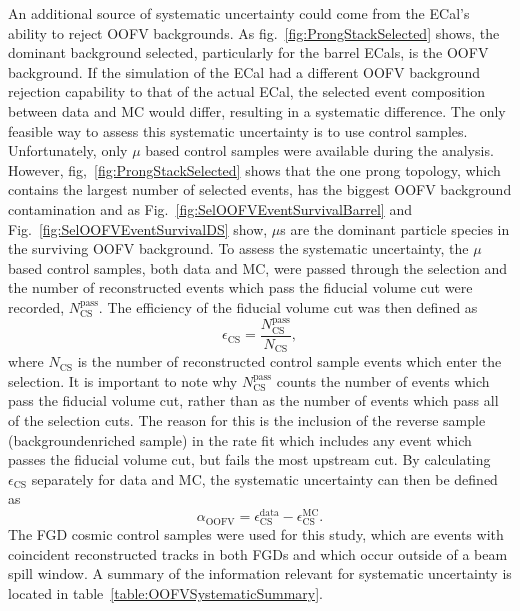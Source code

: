 \newline
\newline
An additional source of systematic uncertainty could come from the ECal's ability to reject OOFV backgrounds. As fig.~\ref{fig:ProngStackSelected} shows, the dominant background selected, particularly for the barrel ECals, is the OOFV background.  If the simulation of the ECal had a different OOFV background rejection capability to that of the actual ECal, the selected event composition between data and MC would differ, resulting in a systematic difference.  The only feasible way to assess this systematic uncertainty is to use control samples.  Unfortunately, only $\mu$ based control samples were available during the analysis.  However, fig,~\ref{fig:ProngStackSelected} shows that the one prong topology, which contains the largest number of selected events, has the biggest OOFV background contamination and as Fig.~\ref{fig:SelOOFVEventSurvivalBarrel} and Fig.~\ref{fig:SelOOFVEventSurvivalDS} show, $\mu$s are the dominant particle species in the surviving OOFV background.  To assess the systematic uncertainty, the $\mu$ based control samples, both data and MC, were passed through the selection and the number of reconstructed events which pass the fiducial volume cut were recorded, $N_{\textrm{CS}}^{\textrm{pass}}$.  The efficiency of the fiducial volume cut was then defined as
\begin{equation}
\epsilon_{\textrm{CS}} = \frac{N_{\textrm{CS}}^{\textrm{pass}}}{N_{\textrm{CS}}},
\label{eqn:OOFVCSEfficiency}
\end{equation}
where $N_{\textrm{CS}}$ is the number of reconstructed control sample events which enter the selection.  It is important to note why $N_{\textrm{CS}}^{\textrm{pass}}$ counts the number of events which pass the fiducial volume cut, rather than as the number of events which pass all of the selection cuts.  The reason for this is the inclusion of the reverse sample (backgroundenriched sample) in the rate fit which includes any event which passes the fiducial volume cut, but fails the most upstream cut.  By calculating $\epsilon_{\textrm{CS}}$ separately for data and MC, the systematic uncertainty can then be defined as
\begin{equation}
\alpha_{\textrm{OOFV}} = \epsilon_{\textrm{CS}}^{\textrm{data}} - \epsilon_{\textrm{CS}}^{\textrm{MC}}.
\label{eqn:OOFVSystematic}
\end{equation}
The FGD cosmic control samples were used for this study, which are events with coincident reconstructed tracks in both FGDs and which occur outside of a beam spill window.  A summary of the information relevant for systematic uncertainty is located in table~\ref{table:OOFVSystematicSummary}.  

